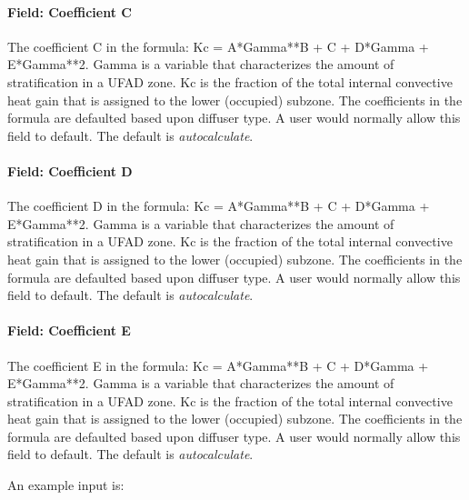 \paragraph{Field: Coefficient C}\label{field-coefficient-c}

The coefficient C in the formula: Kc = A*Gamma**B + C + D*Gamma + E*Gamma**2. Gamma is a variable that characterizes the amount of stratification in a UFAD zone. Kc is the fraction of the total internal convective heat gain that is assigned to the lower (occupied) subzone. The coefficients in the formula are defaulted based upon diffuser type. A user would normally allow this field to default. The default is \emph{autocalculate}.

\paragraph{Field: Coefficient D}\label{field-coefficient-d}

The coefficient D in the formula: Kc = A*Gamma**B + C + D*Gamma + E*Gamma**2. Gamma is a variable that characterizes the amount of stratification in a UFAD zone. Kc is the fraction of the total internal convective heat gain that is assigned to the lower (occupied) subzone. The coefficients in the formula are defaulted based upon diffuser type. A user would normally allow this field to default. The default is \emph{autocalculate}.

\paragraph{Field: Coefficient E}\label{field-coefficient-e}

The coefficient E in the formula: Kc = A*Gamma**B + C + D*Gamma + E*Gamma**2. Gamma is a variable that characterizes the amount of stratification in a UFAD zone. Kc is the fraction of the total internal convective heat gain that is assigned to the lower (occupied) subzone. The coefficients in the formula are defaulted based upon diffuser type. A user would normally allow this field to default. The default is \emph{autocalculate}.

An example input is:

